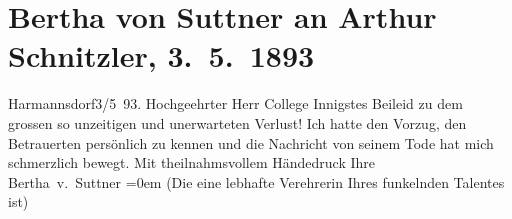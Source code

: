 

         
         \renewcommand{\erwaehntePersonen}{Personen: Johann Schnitzler}
         \renewcommand{\erwaehnteOrte}{Orte: Harmannsdorf, Wien}
         \renewcommand{\erwaehnteWerke}{}
               \section[Bertha von Suttner an Arthur Schnitzler, 3. 5. 1893]{ Bertha von Suttner an Arthur Schnitzler, 3. 5. 1893}\nopagebreak{}\rehead{ }\begin{ledgroupsized}[t]{13cm}\normalsize\beginnumbering \toendnotes[C]{\smallbreak\pagebreak[2]} 
\toendnotes[C]{\smallbreak}\pstart
           \noindent{}{\pb}\textcolor{gray}{\textbf{\label{T_L00210-1v}\label{T_L00210-1h}}}\hfill Harmannsdorf3/5 93.\pend
           \pstart{}Hochgeehrter Herr College\pend\pstart
           Innigstes Beileid zu dem grossen so unzeitigen und unerwarteten Verlust! Ich hatte
               den Vorzug, den Betrauerten
               persönlich zu kennen und die Nachricht von seinem Tode hat mich schmerzlich bewegt.
               Mit theilnahms{\pb}vollem Händedruck\pend
           \pstart
           Ihre{\\[\baselineskip]}\spacefill\mbox{Bertha v. Suttner}\pend
           \leftskip=0em{}\pstart
           \noindent{}(Die eine lebhafte Verehrerin Ihres funkelnden Talentes ist)\pend
           
         
         \endnumbering{}\end{ledgroupsized}  \newcommand{\dateiname}{L00210}\newcommand{\titel}{Bertha von Suttner an Arthur Schnitzler, 3. 5. 1893}\newcommand{\editorInnen}{Martin Anton Müller und Gerd-Hermann Susen}
      